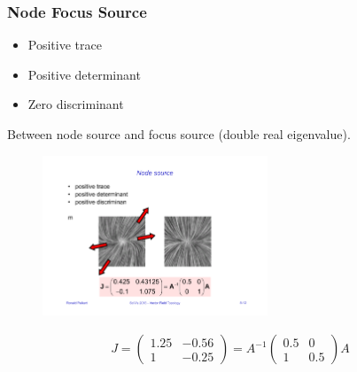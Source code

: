 \subsubsection{Node Focus Source}
\begin{itemize}
    \item Positive trace
    \item Positive determinant
    \item Zero discriminant
\end{itemize}
Between node source and focus source (double real eigenvalue).
\begin{figure}[H]
    \centering
    \includegraphics[width=0.6\textwidth,page=6]{img/08_2d_critical_points}
\end{figure}
\begin{align*}
J = \begin{pmatrix}
     1.25 & -0.56\\
     1 & -0.25
 \end{pmatrix}
 = A ^{-1} 
     \begin{pmatrix}
         0.5 & 0\\
         1 & 0.5
     \end{pmatrix}A
\end{align*}

